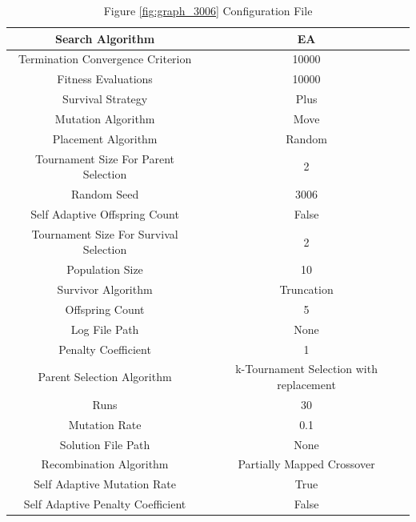\documentclass{standalone}
\begin{document}
\begin{table}[!htb]
	\centering
	\caption{Figure \ref{fig:graph_3006} Configuration File}
	\label{tab:graph_3006}
	\begin{tabular}{| c | c |}
		\hline
		Search Algorithm		& EA		 \\
		\hline
		Termination Convergence Criterion		& 10000		 \\
		\hline
		Fitness Evaluations		& 10000		 \\
		\hline
		Survival Strategy		& Plus		 \\
		\hline
		Mutation Algorithm		& Move		 \\
		\hline
		Placement Algorithm		& Random		 \\
		\hline
		Tournament Size For Parent Selection		& 2		 \\
		\hline
		Random Seed		& 3006		 \\
		\hline
		Self Adaptive Offspring Count		& False		 \\
		\hline
		Tournament Size For Survival Selection		& 2		 \\
		\hline
		Population Size		& 10		 \\
		\hline
		Survivor Algorithm		& Truncation		 \\
		\hline
		Offspring Count		& 5		 \\
		\hline
		Log File Path		& None		 \\
		\hline
		Penalty Coefficient		& 1		 \\
		\hline
		Parent Selection Algorithm		& k-Tournament Selection with replacement		 \\
		\hline
		Runs		& 30		 \\
		\hline
		Mutation Rate		& 0.1		 \\
		\hline
		Solution File Path		& None		 \\
		\hline
		Recombination Algorithm		& Partially Mapped Crossover		 \\
		\hline
		Self Adaptive Mutation Rate		& True		 \\
		\hline
		Self Adaptive Penalty Coefficient		& False		 \\
		\hline
	\end{tabular}
\end{table}
\end{document}
